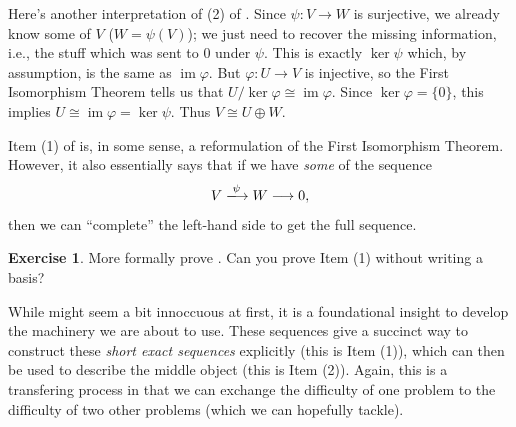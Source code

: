 \documentclass[12pt,a4paper]{article}
\DeclareMathOperator{\image}{im}
\theoremstyle{definition}
\newtheorem{exercise}[theorem]{Exercise}
\numberwithin{equation}{section}
\begin{document}
Here's another interpretation of (2) of .
Since $\psi \colon V \to W$ is surjective, we already know some of $V$ ($W = \psi(V)$); we just need to recover the missing information, i.e., the stuff which was sent to $0$ under $\psi$.
This is exactly $\ker{\psi}$ which, by assumption, is the same as $\image{\varphi}$.
But $\varphi \colon U \to V$ is injective, so the First Isomorphism Theorem tells us that $U / \ker{\varphi} \cong \image{\varphi}$.
Since $\ker{\varphi} = \{ 0 \}$, this implies $U \cong \image{\varphi} = \ker{\psi}$.
Thus $V \cong U \oplus W$.

Item (1) of  is, in some sense, a reformulation of the First Isomorphism Theorem.
However, it also essentially says that if we have \emph{some} of the sequence
\begin{equation*}
    V \xlongrightarrow[]{\psi} W \longrightarrow 0,
\end{equation*}
then we can ``complete'' the left-hand side to get the full sequence.

\begin{exercise}
    More formally prove .
    Can you prove Item (1) without writing a basis?
\end{exercise}

While  might seem a bit innoccuous at first, it is a foundational insight to develop the machinery we are about to use.
These sequences give a succinct way to construct these \emph{short exact sequences} explicitly (this is Item (1)), which can then be used to describe the middle object (this is Item (2)).
Again, this is a transfering process in that we can exchange the difficulty of one problem to the difficulty of two other problems (which we can hopefully tackle).
\end{document}
